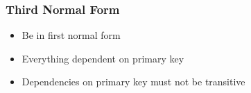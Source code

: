 \documentclass[12pt]{article}
\begin{document}
\subsubsection{Third Normal Form}
\begin{itemize}
  \item {Be in first normal form}
  \item {Everything dependent on primary key}
  \item {Dependencies on primary key must not be transitive}
\end{itemize}
\end{document}
